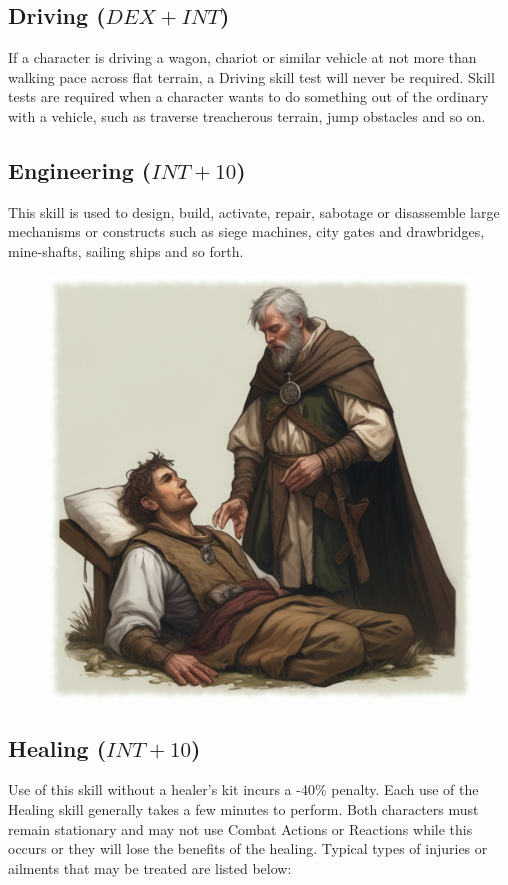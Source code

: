 \subsection{Driving ($DEX+INT$)}
If a character is driving a wagon, chariot or similar vehicle at not more than walking pace across flat terrain, a Driving skill test will never be required. Skill tests are required when a character wants to do something out of the ordinary with a vehicle, such as traverse treacherous terrain, jump obstacles and so on.

\subsection{Engineering ($INT+10$)}
This skill is used to design, build, activate, repair, sabotage or disassemble large mechanisms or constructs such as siege machines, city gates and drawbridges, mine-shafts, sailing ships and so forth. 

\begin{figure}[h]
\begin{center}
\includegraphics[scale=0.23]{img/ai-images/healer-tending.png}
\end{center}
\end{figure}

\subsection{Healing ($INT+10$)}
Use of this skill without a healer’s kit incurs a -40\% penalty. Each use of the Healing skill generally takes a few minutes to perform. Both characters must remain stationary and may not use Combat Actions or Reactions while this occurs or they will lose the benefits of the healing. Typical types of injuries or ailments that may be treated are listed below:

